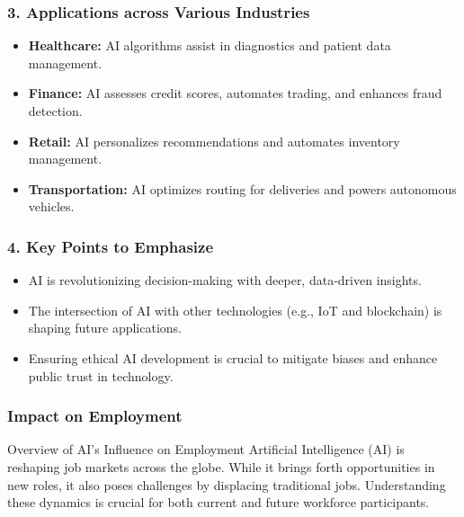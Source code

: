 \documentclass[aspectratio=169]{beamer}
\begin{document}
\begin{frame}[fragile]
    \frametitle{3. Applications across Various Industries}
    \begin{itemize}
        \item \textbf{Healthcare:} AI algorithms assist in diagnostics and patient data management.
        \item \textbf{Finance:} AI assesses credit scores, automates trading, and enhances fraud detection.
        \item \textbf{Retail:} AI personalizes recommendations and automates inventory management.
        \item \textbf{Transportation:} AI optimizes routing for deliveries and powers autonomous vehicles.
    \end{itemize}
\end{frame}

\begin{frame}[fragile]
    \frametitle{4. Key Points to Emphasize}
    \begin{itemize}
        \item AI is revolutionizing decision-making with deeper, data-driven insights.
        \item The intersection of AI with other technologies (e.g., IoT and blockchain) is shaping future applications.
        \item Ensuring ethical AI development is crucial to mitigate biases and enhance public trust in technology.
    \end{itemize}
\end{frame}

\begin{frame}[fragile]
    \frametitle{Impact on Employment}
    \begin{block}{Overview of AI's Influence on Employment}
        Artificial Intelligence (AI) is reshaping job markets across the globe. 
        While it brings forth opportunities in new roles, it also poses challenges by displacing traditional jobs. 
        Understanding these dynamics is crucial for both current and future workforce participants.
    \end{block}
\end{frame}
\end{document}
